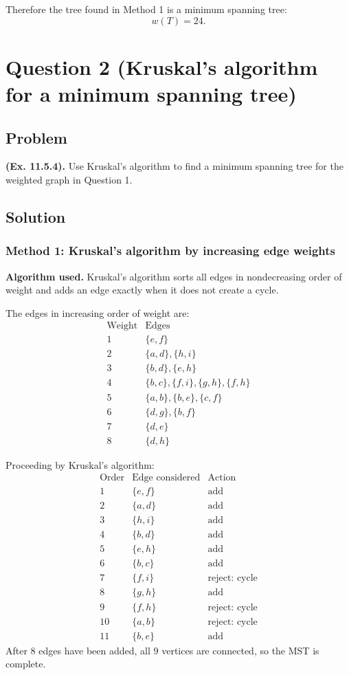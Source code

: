 \documentclass[12pt]{article}
\begin{document}
Therefore the tree found in Method 1 is a minimum spanning tree:
\[
  \boxed{w(T)=24.}
\]

\newpage
\section{Question 2 (Kruskal's algorithm for a minimum spanning tree)}

\subsection{Problem}
\textbf{(Ex. 11.5.4).} Use Kruskal's algorithm to find a minimum spanning tree for the weighted graph in Question 1.

\subsection{Solution}

\subsubsection{Method 1: Kruskal's algorithm by increasing edge weights}
\textbf{Algorithm used.} Kruskal's algorithm sorts all edges in nondecreasing order of weight and adds an edge exactly when it does not create a cycle.

The edges in increasing order of weight are:
\[
\begin{array}{c|c}
\text{Weight} & \text{Edges}\\ \hline
1 & \{e,f\}\\
2 & \{a,d\},\{h,i\}\\
3 & \{b,d\},\{e,h\}\\
4 & \{b,c\},\{f,i\},\{g,h\},\{f,h\}\\
5 & \{a,b\},\{b,e\},\{c,f\}\\
6 & \{d,g\},\{b,f\}\\
7 & \{d,e\}\\
8 & \{d,h\}
\end{array}
\]

Proceeding by Kruskal's algorithm:
\[
\begin{array}{c|c|c}
\text{Order} & \text{Edge considered} & \text{Action}\\ \hline
1 & \{e,f\} & \text{add}\\
2 & \{a,d\} & \text{add}\\
3 & \{h,i\} & \text{add}\\
4 & \{b,d\} & \text{add}\\
5 & \{e,h\} & \text{add}\\
6 & \{b,c\} & \text{add}\\
7 & \{f,i\} & \text{reject: cycle}\\
8 & \{g,h\} & \text{add}\\
9 & \{f,h\} & \text{reject: cycle}\\
10 & \{a,b\} & \text{reject: cycle}\\
11 & \{b,e\} & \text{add}
\end{array}
\]
After $8$ edges have been added, all $9$ vertices are connected, so the MST is complete.
\end{document}
